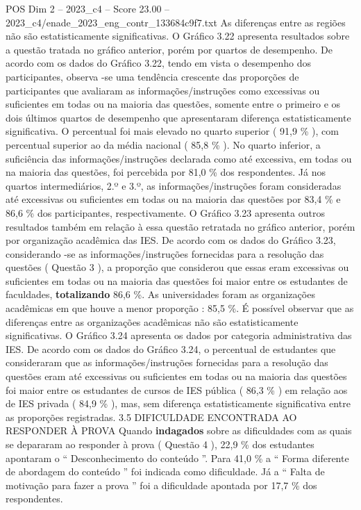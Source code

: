 \begin{textsample}{POS Dim 2 – 2023\_c4 – Score 23.00 – 2023\_c4/enade\_2023\_eng\_contr\_133684c9f7.txt}
As diferenças entre as regiões não são estatisticamente significativas.
O Gráfico 3.22 apresenta resultados sobre a questão tratada no gráfico anterior, porém por quartos de desempenho.
De acordo com os dados do Gráfico 3.22, tendo em vista o desempenho dos participantes, observa -se uma tendência crescente das proporções de participantes que avaliaram as informações/instruções como excessivas ou suficientes em todas ou na maioria das questões, somente entre o primeiro e os dois últimos quartos de desempenho que apresentaram diferença estatisticamente significativa.
O percentual foi mais elevado no quarto superior ( 91,9 \% ), com percentual superior ao da média nacional ( 85,8 \% ).
No quarto inferior, a suficiência das informações/instruções declarada como até excessiva, em todas ou na maioria das questões, foi percebida por 81,0 \% dos respondentes.
Já nos quartos intermediários, 2.º e 3.º, as informações/instruções foram consideradas até excessivas ou suficientes em todas ou na maioria das questões por 83,4 \% e 86,6 \% dos participantes, respectivamente.
O Gráfico 3.23 apresenta outros resultados também em relação à essa questão retratada no gráfico anterior, porém por organização acadêmica das IES.
De acordo com os dados do Gráfico 3.23, considerando -se as informações/instruções fornecidas para a resolução das questões ( Questão 3 ), a proporção que considerou que essas eram excessivas ou suficientes em todas ou na maioria das questões foi maior entre os estudantes de faculdades, \textbf{totalizando} 86,6 \%.
As universidades foram as organizações acadêmicas em que houve a menor proporção : 85,5 \%.
É possível observar que as diferenças entre as organizações acadêmicas não são estatisticamente significativas.
O Gráfico 3.24 apresenta os dados por categoria administrativa das IES.
De acordo com os dados do Gráfico 3.24, o percentual de estudantes que consideraram que as informações/instruções fornecidas para a resolução das questões eram até excessivas ou suficientes em todas ou na maioria das questões foi maior entre os estudantes de cursos de IES pública ( 86,3 \% ) em relação aos de IES privada ( 84,9 \% ), mas, sem diferença estatisticamente significativa entre as proporções registradas. 3.5 DIFICULDADE ENCONTRADA AO RESPONDER À PROVA Quando \textbf{indagados} sobre as dificuldades com as quais se depararam ao responder à prova ( Questão 4 ), 22,9 \% dos estudantes apontaram o “ Desconhecimento do conteúdo ”.
Para 41,0 \% a “ Forma diferente de abordagem do conteúdo ” foi indicada como dificuldade.
Já a “ Falta de motivação para fazer a prova ” foi a dificuldade apontada por 17,7 \% dos respondentes.

\end{textsample}
